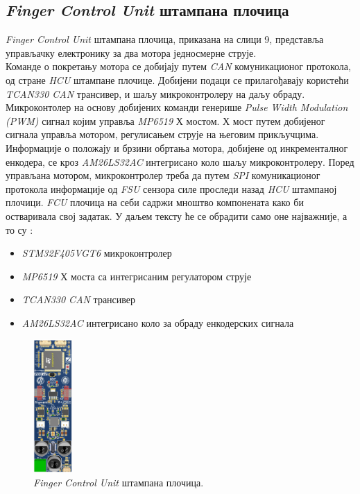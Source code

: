 \documentclass{article}
\begin{document}
\subsection{\textit{Finger Control Unit} штампана плочица} 
\textit{Finger Control Unit} штампана плочица, приказана на слици 9, представља управљачку електронику за два мотора једносмерне струје.\\ 
Команде о покретању мотора се добијају путем \textit{CAN} комуникационог протокола, од стране \textit{HCU} штампане плочице. Добијени подаци 
се прилагођавају користећи \textit{TCAN330 CAN} трансивер, и шаљу микроконтролеру на даљу обраду. Микроконтолер на основу добијених команди 
генерише \textit{Pulse Width Modulation (PWM)} сигнал којим управља \textit{MP6519} Х мостом. Х мост путем добијеног сигнала управља мотором, 
регулисањем струје на његовим прикључцима. Информације о положају и брзини обртања мотора, добијене од инкременталног енкодера, се кроз 
\textit{AM26LS32AC} интегрисано коло шаљу микроконтролеру. Поред управљана мотором, микроконтролер треба да путем \textit{SPI} комуникационог 
протокола информације од \textit{FSU} сензора силе проследи назад \textit{HCU} штампаној плочици.
\textit{FCU} плочица на себи 
садржи мноштво компонената како би остваривала свој задатак. У даљем тексту ће се обрадити само оне најважније, а то су :
\begin{itemize}
    \item \textit{STM32F405VGT6} микроконтролер \cite{stm32_f4_data}
    \item \textit{MP6519} Х моста са интегрисаним регулатором струје \cite{mp6519}
    \item \textit{TCAN330 CAN} трансивер \cite{tcan330}
    \item \textit{AM26LS32AC} интегрисано коло за обраду енкодерских сигнала \cite{am26ls32}
\end{itemize}


\begin{figure}[H]
\centering
\includegraphics[height=2in]{Images/FCU.png}
\caption{\textit{Finger Control Unit} штампана плочица.}
\label{fig:figure10}
\end{figure}
\end{document}
